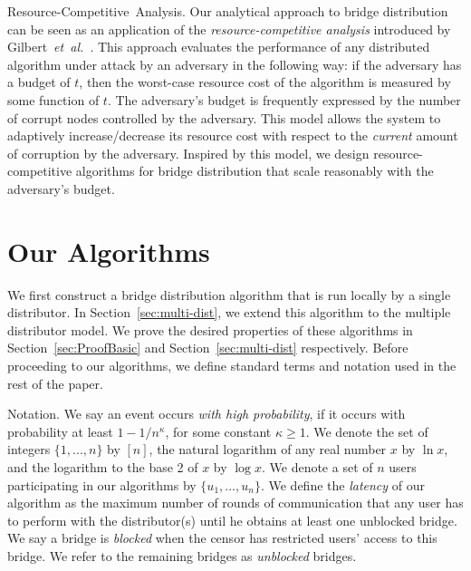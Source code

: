 \documentclass[USenglish,oneside,twocolumn]{article}
\newcommand{\fullpaper}[1]{#1}
\newcommand{\fullpaper}[1]{}
\newcommand{\etal}{\textit{et~al.}}
\newcommand{\sfsize}{\fontsize{0.68\baselineskip}{0.68\baselineskip}\selectfont}
\newcommand{\sans}[1]{\textsf{\sfsize \mbox{#1}}}
\newcommand{\para}[1]{\vspace{0.85em} \noindent \sans{{\mbox{#1}}}}
\begin{document}
\para{Resource-Competitive Analysis.} Our analytical approach to bridge distribution can be seen as an application of the \emph{resource-competitive analysis} introduced by Gilbert~\etal~\cite{Gilbert:2012:RAN:2335470.2335471,Bender:2015:SIGACT}. This approach evaluates the performance of any distributed algorithm under attack by an adversary in the following way: if the adversary has a budget of $t$, then the worst-case resource cost of the algorithm is measured by some function of $t$. The adversary's budget is frequently expressed by the number of corrupt nodes controlled by the adversary. This model allows the system to adaptively increase/decrease its resource cost with respect to the \emph{current} amount of corruption by the adversary. Inspired by this model, we design resource-competitive algorithms for bridge distribution that scale reasonably with the adversary's budget.

\section{Our Algorithms} \label{sec:algorithm} 
We first construct a bridge distribution algorithm that is run locally by a single distributor. In Section~\ref{sec:multi-dist}, we extend this algorithm to the multiple distributor model.
We prove the desired properties of these algorithms in Section~\ref{sec:ProofBasic} and Section~\ref{sec:multi-dist} respectively. 
Before proceeding to our algorithms, we define standard terms and notation used in the rest of the paper. 

\para{Notation.} We say an event occurs \emph{with high probability}, if it occurs with probability at least \emph{${1-1/n^\kappa}$}, for some constant ${\kappa \geq 1}$. We denote the set of integers ${\{1,...,n\}}$ by $[n]$, the natural logarithm of any real number $x$ by $\ln{x}$, and the logarithm to the base 2 of $x$ by $\log{x}$. We denote a set of $n$ users participating in our algorithms by ${\{u_1,...,u_n\}}$. We define the \emph{latency} of our algorithm as the maximum number of rounds of communication that any user has to perform with the distributor(s) until he obtains at least one unblocked bridge. \fullpaper{We say a bridge is \emph{blocked} when the censor has restricted users' access to this bridge. We refer to the remaining bridges as \emph{unblocked} bridges.}
\end{document}
